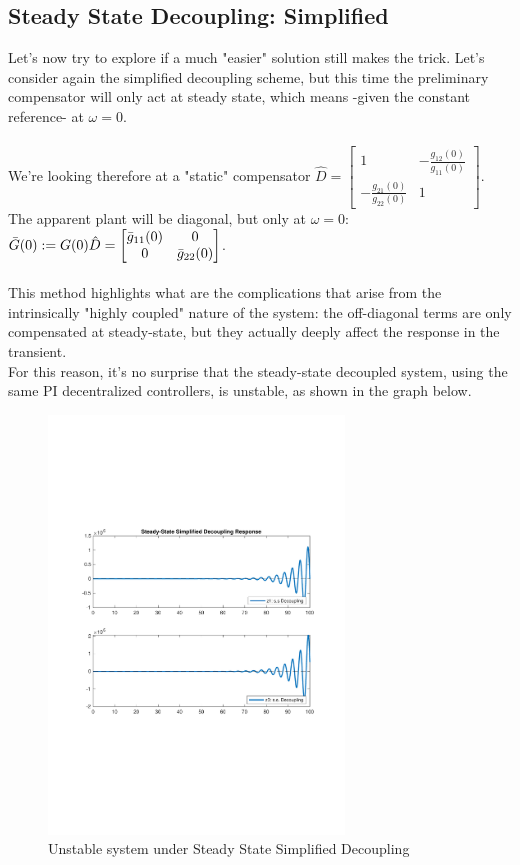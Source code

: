 \documentclass[a4paper, 12pt]{article}
\def\FigureTwelve{\centering\includegraphics[width=0.7\textwidth]{Figures/fig12.pdf}}
\begin{document}
\subsection{Steady State Decoupling: Simplified}
Let's now try to explore if a much "easier" solution still makes the trick. Let's consider again the simplified decoupling scheme, but this time the preliminary compensator will only act at steady state, which means -given the constant reference- at $\omega = 0$.
\\\\
We're looking therefore at a "static" compensator 
$\hat{D} = \begin{bmatrix}
1 & -\frac{g_{12}(0)}{g_{11}(0)}\\
-\frac{g_{21}(0)}{g_{22}(0)} & 1
\end{bmatrix}$. The apparent plant will be diagonal, but only at $\omega = 0$: $\Bar{G}(0) := G(0)\hat{D} = \begin{bmatrix}
\Bar{g}_{11}(0) & 0\\
0 & \Bar{g}_{22}(0)
\end{bmatrix}$.
\\\\This method highlights what are the complications that arise from the intrinsically "highly coupled" nature of the system: the off-diagonal terms are only compensated at steady-state, but they actually deeply affect the response in the transient.
\\For this reason, it's no surprise that the steady-state decoupled system, using the same PI decentralized controllers, is unstable, as shown in the graph below.
\begin{figure}[h!]
    \FigureTwelve
    \caption{Unstable system under Steady State Simplified Decoupling}
    \label{fig:fig12}
\end{figure}
\end{document}

